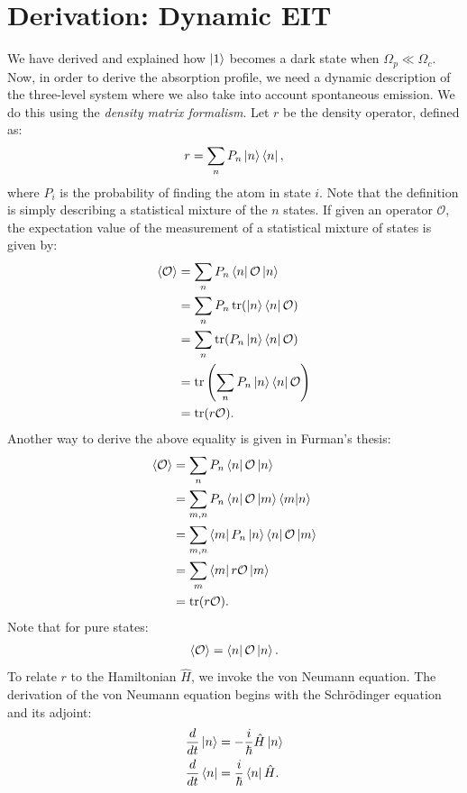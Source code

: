 \documentclass{article}
\theoremstyle{definition}
\begin{document}
\section{Derivation: Dynamic EIT}
We have derived and explained how $\ket{1}$ becomes a dark state when $\Omega_p \ll \Omega_c$. Now, in order to derive the absorption profile, we need a dynamic description of the three-level system where we also take into account spontaneous emission. We do this using the \textit{density matrix formalism}. Let $r$ be the density operator, defined as:
\begin{align}
r = \sum_{n}P_n\ket{n}\bra{n},
\end{align}
where $P_i$ is the probability of finding the atom in state $i$. Note that the definition is simply describing a statistical mixture of the $n$ states. If given an operator $\mathcal{O}$, the expectation value of the measurement of a statistical mixture of states is given by:
\begin{align}
\langle \mathcal{O}\rangle &=\sum_{n}P_n\bra{n}\mathcal{O}\ket{n}\nonumber\\
&= \sum_{n}P_n\tr(\ket{n}\bra{n}\mathcal{O})\nonumber\\
&= \sum_{n}\tr(P_n\ket{n}\bra{n}\mathcal{O})\nonumber\\
&= \tr\left( \sum_{n}P_n\ket{n}\bra{n}\mathcal{O}\right) \nonumber\\
&= \tr(r\mathcal{O}).
\end{align}
Another way to derive the above equality is given in Furman's thesis:
\begin{align}
\langle \mathcal{O}\rangle &=\sum_{n}P_n\bra{n}\mathcal{O}\ket{n}\nonumber\\
&= \sum_{m,n}P_n\bra{n}\mathcal{O}\ket{m}\bra{m}\ket{n}\nonumber\\
&= \sum_{m,n}\bra{m}P_n\ket{n}\bra{n}\mathcal{O}\ket{m}\nonumber\\
&= \sum_{m}\bra{m}r\mathcal{O}\ket{m}\nonumber\\
&= \tr(r\mathcal{O}).
\end{align}
Note that for pure states:
\begin{align}
\langle \mathcal{O} \rangle = \bra{n}\mathcal{O}\ket{n}.
\end{align}
To relate $r$ to the Hamiltonian $\hat{H}$, we invoke the von Neumann equation. The derivation of the von Neumann equation begins with the Schr\"{o}dinger equation and its adjoint:
\begin{align}
\frac{d}{dt}\ket{n} &= -\frac{i}{\hbar}\hat{H}\ket{n}\\
\frac{d}{dt}\bra{n} &= \frac{i}{\hbar}\bra{n}\hat{H}.
\end{align}
\end{document}
